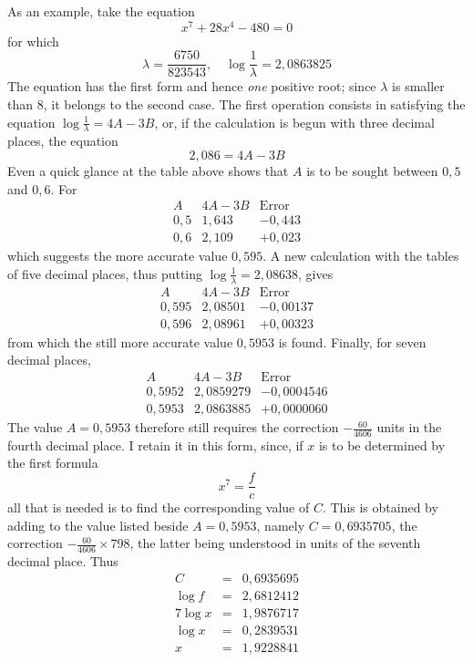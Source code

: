 As an example, take the equation
\[
x^7+28x^4-480=0
\]
for which
\[
\lambda=\frac{6750}{823543},\quad \log\frac{1}{\lambda}=2{,}0863825
\]
The equation has the first form and hence \textit{one} positive root; since $\lambda$ is smaller than $8$, it belongs to the second case. The first operation consists in satisfying the equation $\log\frac{1}{\lambda}=4A-3B$, or, if the calculation is begun with three decimal places, the equation
\[
2{,}086=4A-3B
\]
Even a quick glance at the table above shows that $A$ is to be sought between $0{,}5$ and $0{,}6$. For
\[
\begin{array}{c|c|c}
A&4A-3B&\mbox{Error}\\\hline
0{,}5&1{,}643&-0{,}443\\
0{,}6&2{,}109&+0{,}023
\end{array}
\]
which suggests the more accurate value $0{,}595$. A new calculation with the tables of five decimal places, thus putting $\log\frac{1}{\lambda}=2{,}08638$, gives
\[
\begin{array}{c|c|c}
A&4A-3B&\mbox{Error}\\\hline
0{,}595&2{,}08501&-0{,}00137\\
0{,}596&2{,}08961&+0{,}00323
\end{array}
\]
from which the still more accurate value $0{,}5953$ is found. Finally, for seven decimal places,
\[
\begin{array}{c|c|c}
A&4A-3B&\mbox{Error}\\\hline
0{,}5952&2{,}0859279&-0{,}0004546\\
0{,}5953&2{,}0863885&+0{,}0000060
\end{array}
\]
The value $A=0{,}5953$ therefore still requires the correction $-\frac{60}{4606}$ units in the fourth decimal place. I retain it in this form, since, if $x$ is to be determined by the first formula
\[
x^{7}=\frac{f}{c}
\]
all that is needed is to find the corresponding value of $C$. This is obtained by adding to the value listed beside $A=0{,}5953$, namely $C=0{,}6935705$, the correction $-\frac{60}{4606}\times798$, the latter being understood in units of the seventh decimal place. Thus
\[
\begin{array}{rcl}
C&=&0{,}6935695\\
\log f&=&2{,}6812412\\ \hline
7\log x&=&1{,}9876717\\
\log x&=&0{,}2839531\\
x&=&1{,}9228841
\end{array}
\]

